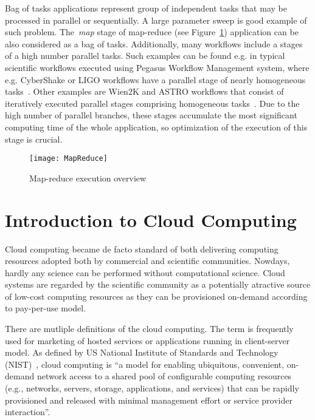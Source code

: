 Bag of tasks applications represent group of independent tasks that may be processed in parallel or sequentially. A large parameter sweep is good example of such problem. The \emph{map} stage of map-reduce (see Figure~\ref{fig:intro:mapreduce}) application can be also considered as a bag of tasks. Additionally, many workflows include a stages of a high number parallel tasks. Such examples can be found e.g. in typical scientific workflows executed using Pegasus Workflow Management system, where e.g. CyberShake or LIGO workflows have a parallel stage of nearly homogeneous tasks~\cite{Bharathi08}. Other examples are Wien2K and ASTRO workflows that consist of iteratively executed parallel stages comprising homogeneous tasks~\cite{Duan12}. Due to the high number of parallel branches, these stages accumulate the most significant computing time of the whole application, so optimization of the execution of this stage is crucial.


\begin{figure}[tb]
   \centering
   \texttt{[image: MapReduce]}  
   \caption{Map-reduce execution overview\cite{Dean:2008:MapReduce}}
   \label{fig:intro:mapreduce}
\end{figure} 


\section{Introduction to Cloud Computing}
\label{intro:cloud}

Cloud computing became de facto standard of both delivering computing resources adopted both by commercial and scientific communities.  Nowdays, hardly any science can be performed without computational science. Cloud systems are regarded by the scientific community as a potentially atractive source of low-cost computing resources as they can be provisioned on-demand according to pay-per-use model.

There are mutliple definitions of the cloud computing. The term is frequently used for marketing of hosted services or applications running in client-server model. As defined by US National Institute of Standards and Technology (NIST)~\cite{NISTCloudDef}, cloud computing is “a model for enabling ubiquitous, convenient, on-demand network access to a shared pool of configurable computing resources (e.g., networks, servers, storage, applications, and services) that can be rapidly provisioned and released with minimal management effort or service provider interaction”.

